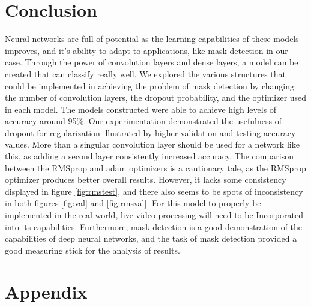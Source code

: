 \documentclass[twocolumn,letterpaper,10pt]{article}
\begin{document}
\section{Conclusion}
Neural networks are full of potential as the learning capabilities of these models improves, and it's ability to adapt to applications, like mask detection in our case. Through the power of convolution layers and dense layers, a model can be created that can classify really well. We explored the various structures that could be implemented in achieving the problem of mask detection by changing the number of convolution layers, the dropout probability, and the optimizer used in each model. The models constructed were able to achieve high levels of accuracy around 95\%. Our experimentation demonstrated the usefulness of dropout for regularization illustrated by higher validation and testing accuracy values. More than a singular convolution layer should be used for a network like this, as adding a second layer consistently increased accuracy. The comparison between the RMSprop and adam optimizers is a cautionary tale, as the RMSprop optimizer produces better overall results. However, it lacks some consistency displayed in figure \ref{fig:rmstest}, and there also seems to be spots of inconsistency in both figures \ref{fig:val} and \ref{fig:rmsval}. For this model to properly be implemented in the real world, live video processing will need to be Incorporated into its capabilities. Furthermore, mask detection is a good demonstration of the capabilities of deep neural networks, and the task of mask detection provided a good measuring stick for the analysis of results.

\section{Appendix}
\label{append}
\end{document}
